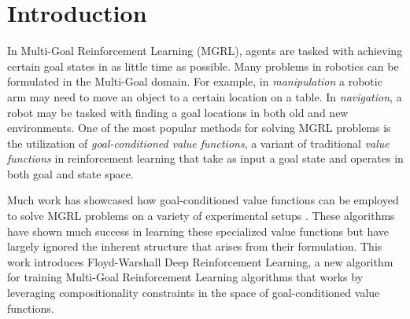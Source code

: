 \section{Introduction}



In Multi-Goal Reinforcement Learning (MGRL)\citep{plappert2018multi}, agents are
tasked with achieving certain goal states in as little time as possible.
Many problems in robotics can be formulated in the Multi-Goal domain. For
example, in \emph{manipulation} a robotic arm may need to move an object
to a certain location on a table. In \emph{navigation}, a robot may be
tasked with finding a goal locations in both old and new environments.  
One of the most popular methods for solving MGRL problems is the
utilization of \emph{goal-conditioned value functions}, a variant of
traditional \emph{value functions} in reinforcement learning that
take as input a goal state and operates in both goal and state space. 


Much work has showcased how goal-conditioned value functions can be
employed to solve MGRL problems on a variety of experimental setups
\citep{sutton2011horde, schaul2015universal,andrychowicz2017hindsight}.
These algorithms have shown much success in learning these specialized
value functions but have largely ignored the inherent structure that
arises from their formulation. This work introduces Floyd-Warshall Deep
Reinforcement Learning, a new algorithm for training Multi-Goal
Reinforcement Learning algorithms that works by leveraging
compositionality constraints in the space of goal-conditioned value
functions. 


